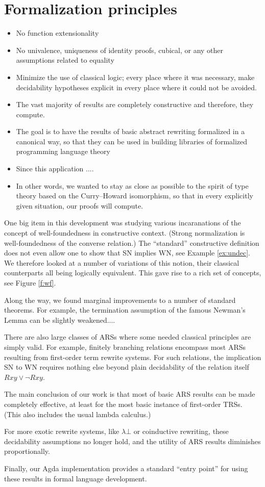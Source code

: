 \documentclass{scrartcl}
\begin{document}
\section{Formalization principles}

\begin{itemize}
  \item No function extensionality
  \item No univalence, uniqueness of identity proofs, cubical, or any other
  assumptions related to equality
  \item Minimize the use of classical logic; every place where it was necessary,
  make decidability hypotheses explicit in every place where it could not be avoided.
  \item The vast majority of results are completely constructive and therefore,
  they compute.
  \item The goal is to have the results of basic abstract rewriting
  formalized in a canonical way, so that they can be used in building
  libraries of formalized programming language theory
  \item Since this application ....
  \item In other words, we wanted to stay as close as possible to the spirit of type theory based on the Curry--Howard isomorphism, so that in every explicitly given situation, our proofs will compute.
\end{itemize}

One big item in this development was studying various incaranations of the concept of well-foundedness in constructive context.
(Strong normalization is well-foundedness of the converse relation.)
The ``standard'' constructive definition does not even allow one to show that SN implies WN, see Example \ref{ex:undec}.  We therefore looked at a number of variations of this notion, their classical counterparts all being logically equivalent.  This gave rise to a rich set of concepts, see Figure \ref{f:wf}.

Along the way, we found marginal improvements to a number of standard theorems.
For example, the termination assumption of the famous Newman's Lemma can be slightly weakened....

There are also large classes of ARSs where some needed classical principles are simply valid.  For example, finitely branching relations encompass most ARSs resulting from first-order term rewrite systems.  For such relations, the implication SN to WN requires nothing else beyond plain decidability of
the relation itself $Rxy \lor \lnot Rxy$.

The main conclusion of our work is that most of basic ARS results can be made completely effective, at least for the most basic instance of first-order TRSs.
(This also includes the usual lambda calculus.)

For more exotic rewrite systems, like $\lambda \bot$ or coinductive rewriting,
these decidability assumptions no longer hold, and the utility of ARS results diminishes proportionally.

Finally, our Agda implementation provides a standard ``entry point'' for using these results in formal language development.
\end{document}
